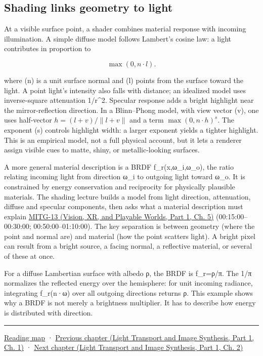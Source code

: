 \subsection{Shading links geometry to light}\label{03-visual-computing-i-ch006-shading-links-geometry-to-light}

\hypertarget{03-visual-computing-i-ch006-shading-links-geometry-to-light}{}

At a visible surface point, a shader combines material response with incoming illumination. A simple diffuse model follows Lambert's cosine law: a light contributes in proportion to

\[
\max(0,n\cdot l).
\]

where (n) is a unit surface normal and (l) points from the surface toward the light. A point light's intensity also falls with distance; an idealized model uses inverse-square attenuation 1/r\^{}2. Specular response adds a bright highlight near the mirror-reflection direction. In a Blinn--Phong model, with view vector (v), one uses half-vector \(h=(l+v)/\|l+v\|\) and a term \(\max(0,n\cdot h)^s\). The exponent (s) controls highlight width: a larger exponent yields a tighter highlight. This is an empirical model, not a full physical account, but it lets a renderer assign visible cues to matte, shiny, or metallic-looking surfaces.

A more general material description is a BRDF f\_r(x,ω\_i,ω\_o), the ratio relating incoming light from direction ω\_i to outgoing light toward ω\_o. It is constrained by energy conservation and reciprocity for physically plausible materials. The shading lecture builds a model from light direction, attenuation, diffuse and specular components, then asks what a material description must explain \href{../07-Vision-XR-and-Playable-Worlds-P01/main.pdf\#nameddest=04-visual-computing-ii-ch036-mitg-13---shading}{MITG-13 (Vision, XR, and Playable Worlds, Part 1, Ch. 5)} (00:15:00--00:30:00; 00:50:00--01:10:00). The key separation is between geometry (where the point and normal are) and material (how the point scatters light). A bright pixel can result from a bright source, a facing normal, a reflective material, or several of these at once.

For a diffuse Lambertian surface with albedo ρ, the BRDF is f\_r=ρ/π. The 1/π normalizes the reflected energy over the hemisphere: for unit incoming radiance, integrating f\_r(n·ω) over all outgoing directions returns ρ. This example shows why a BRDF is not merely a brightness multiplier. It has to describe how energy is distributed with direction.

\begin{center}\rule{0.5\linewidth}{0.5pt}\end{center}

\hyperref[volume-reading-map]{Reading map} · \href{../04-Light-Transport-and-Image-Synthesis-P01/main.pdf\#nameddest=03-visual-computing-i-ch005-reflectance-materials-and-light-transport}{Previous chapter (Light Transport and Image Synthesis, Part 1, Ch. 1)} · \href{../04-Light-Transport-and-Image-Synthesis-P01/main.pdf\#nameddest=03-visual-computing-i-ch007-the-rendering-equation-and-path-probabilities}{Next chapter (Light Transport and Image Synthesis, Part 1, Ch. 2)}

